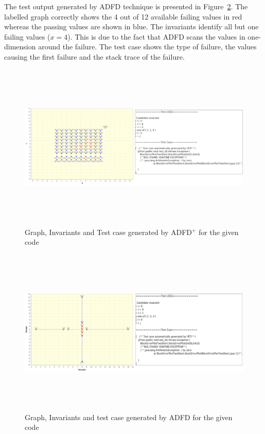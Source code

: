 The test output generated by ADFD technique is presented in Figure~\ref{fig:ADFD}. The labelled graph correctly shows the 4 out of 12 available failing values in red whereas the passing values are shown in blue. The invariants identify all but one failing values ($x = 4$). This is due to the fact that ADFD scans the values in one-dimension around the failure. The test case shows the type of failure, the values causing the first failure and the stack trace of the failure. 


\bigskip
\begin{figure}[H]
\centering
\includegraphics[width= 15.5cm,height=8cm]{chapter7/adfdPlusCombined.png}
\caption{Graph, Invariants and Test case generated by ADFD$^+$ for the given code}
\label{fig:ADFD+}
\end{figure}
\bigskip



\begin{figure}[H]
\centering
\includegraphics[width= 15.5cm,height=8cm]{chapter7/adfdCombined.png}
\caption{Graph, Invariants and test case generated by ADFD for the given code}
\label{fig:ADFD}
\end{figure}

